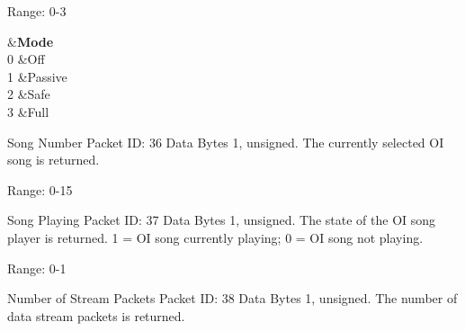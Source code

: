 \begin{Desc}
\begin{description}
Range\+: 0-\/3

\begin{TabularC}{2}
\hline
{}&{\bf Mode  }\\
0 &Off \\
1 &Passive \\
2 &Safe \\
3 &Full \\
\end{TabularC}
\item[{\em 
\hypertarget{group__roomba-lib_gga46f008b5055c4a08d3123c6a3478373eadc89af73d417da0fe50b1c642a8898b9}{}R\+O\+O\+M\+B\+A\+\_\+\+S\+O\+N\+G\+\_\+\+N\+U\+M\+B\+E\+R\label{group__roomba-lib_gga46f008b5055c4a08d3123c6a3478373eadc89af73d417da0fe50b1c642a8898b9}
}]Song Number Packet I\+D\+: 36 Data Bytes 1, unsigned. The currently selected O\+I song is returned.

Range\+: 0-\/15 \item[{\em 
\hypertarget{group__roomba-lib_gga46f008b5055c4a08d3123c6a3478373ea974977adff508d49ff6ae6137d14299a}{}R\+O\+O\+M\+B\+A\+\_\+\+S\+O\+N\+G\+\_\+\+P\+L\+A\+Y\+I\+N\+G\label{group__roomba-lib_gga46f008b5055c4a08d3123c6a3478373ea974977adff508d49ff6ae6137d14299a}
}]Song Playing Packet I\+D\+: 37 Data Bytes 1, unsigned. The state of the O\+I song player is returned. 1 = O\+I song currently playing; 0 = O\+I song not playing.

Range\+: 0-\/1 \item[{\em 
\hypertarget{group__roomba-lib_gga46f008b5055c4a08d3123c6a3478373ead75c3ca1795b78e599fe29b5927de5fd}{}R\+O\+O\+M\+B\+A\+\_\+\+O\+I\+\_\+\+S\+T\+R\+E\+A\+M\+\_\+\+N\+U\+M\+\_\+\+P\+A\+C\+K\+E\+T\+S\label{group__roomba-lib_gga46f008b5055c4a08d3123c6a3478373ead75c3ca1795b78e599fe29b5927de5fd}
}]Number of Stream Packets Packet I\+D\+: 38 Data Bytes 1, unsigned. The number of data stream packets is returned.


\end{description}
\end{Desc}

